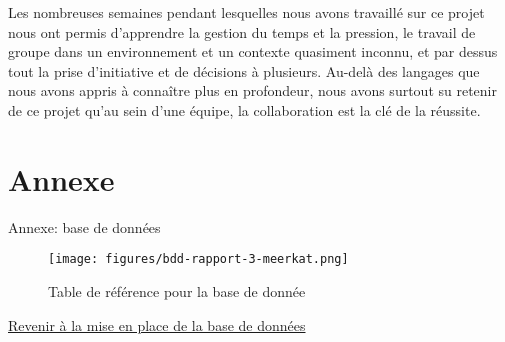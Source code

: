 \documentclass[12pt]{report}
\begin{document}
        \bigskip
        \par
        Les nombreuses semaines pendant lesquelles nous avons travaillé sur ce projet nous ont permis d’apprendre la gestion du temps et la pression, le travail de groupe dans un environnement et un contexte quasiment inconnu, et par dessus tout la prise d’initiative et de décisions à plusieurs. Au-delà des langages que nous avons appris à connaître plus en profondeur, nous avons surtout su retenir de ce projet qu’au sein d’une équipe, la collaboration est la clé de la réussite.

		\chapter{Annexe}
		
	    
	    
	    Annexe: base de données
	    
	    \hypertarget{annexe-bdd-tableref}{}
	    
	    \begin{figure}[!h]
			\centering
				\texttt{[image: figures/bdd-rapport-3-meerkat.png]}
			\caption{Table de référence pour la base de donnée}
		\end{figure}
		\hyperlink{bdd-retour-annexe}{Revenir à la mise en place de la base de données}
		\bigskip
	     
	    
	    
	    
\end{document}
